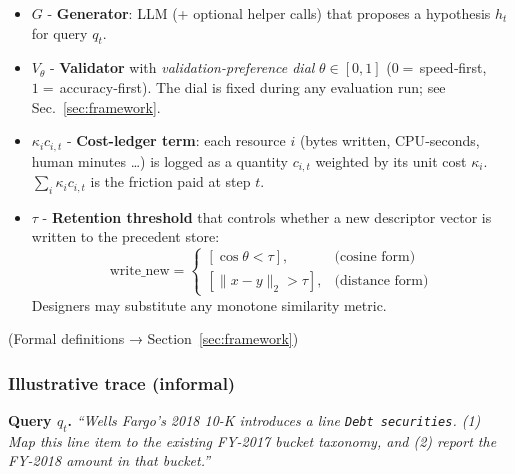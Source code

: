 \documentclass[11pt]{article}
\begin{document}
\begin{tcolorbox}[colback=black!3,colframe=black!40,
  boxrule=0.4pt, arc=2pt, left=2pt, right=2pt,
  top=4pt, bottom=4pt, title=Notation snapshot]
\small
\begin{itemize}[leftmargin=*]
\item $G$ - \textbf{Generator}: LLM (+ optional helper calls)
that proposes a hypothesis $h_t$ for query $q_t$.
\item $V_{\theta}$ - \textbf{Validator} with
\emph{validation-preference dial} $\theta\!\in[0,1]$  
($0 =\,$speed‐first, $1 =\,$accuracy‐first).  
The dial is fixed during any evaluation run; see
Sec.~\ref{sec:framework}.
\item $\kappa_i c_{i,t}$ - \textbf{Cost-ledger term}: each resource $i$
(bytes written, CPU‐seconds, human minutes …) is logged as a
quantity $c_{i,t}$ weighted by its unit cost $\kappa_i$.
$\sum_i\kappa_i c_{i,t}$ is the friction paid at step $t$.
\item $\tau$ - \textbf{Retention threshold} that controls whether a
new descriptor vector is written to the precedent store:  
\vspace{-2pt}
\[
\text{write\_new}=\begin{cases}
[\cos\theta < \tau], &\text{(cosine form)}\\[4pt]
[\lVert x-y\rVert_2 > \tau], &\text{(distance form)}
\end{cases}
\]
Designers may substitute any monotone similarity metric.
\end{itemize}
\vspace{2pt}\par\footnotesize (Formal definitions → Section~\ref{sec:framework})\par
\end{tcolorbox}



\FloatBarrier



\vspace{1em}
\subsubsection*{Illustrative trace (informal)}

\noindent
\textbf{Query $q_t$.}  
\emph{``Wells Fargo's 2018 10-K introduces a line
\texttt{Debt securities}.  
(1) Map this line item to the existing FY-2017 bucket taxonomy, and  
(2) report the FY-2018 amount in that bucket.''}
\end{document}
